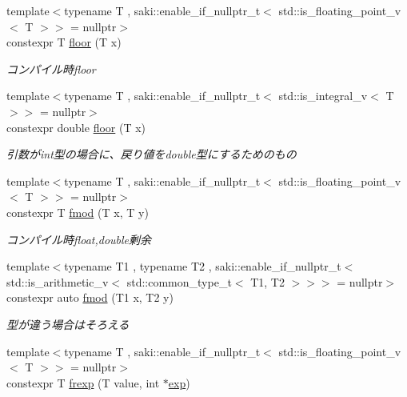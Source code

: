\begin{DoxyCompactItemize}
{\footnotesize template$<$typename T , saki\+::enable\+\_\+if\+\_\+nullptr\+\_\+t$<$ std\+::is\+\_\+floating\+\_\+point\+\_\+v$<$ T $>$$>$  = nullptr$>$ }\\constexpr T \mbox{\hyperlink{namespacesaki_a0718c031975604811084b62bbba93f7f}{floor}} (T x)
\begin{DoxyCompactList}\small\item\em コンパイル時floor \end{DoxyCompactList}\item 
{\footnotesize template$<$typename T , saki\+::enable\+\_\+if\+\_\+nullptr\+\_\+t$<$ std\+::is\+\_\+integral\+\_\+v$<$ T $>$$>$  = nullptr$>$ }\\constexpr double \mbox{\hyperlink{namespacesaki_a327cd6800fef212948644f69cb31d4ff}{floor}} (T x)
\begin{DoxyCompactList}\small\item\em 引数がint型の場合に、戻り値をdouble型にするためのもの \end{DoxyCompactList}\item 
{\footnotesize template$<$typename T , saki\+::enable\+\_\+if\+\_\+nullptr\+\_\+t$<$ std\+::is\+\_\+floating\+\_\+point\+\_\+v$<$ T $>$$>$  = nullptr$>$ }\\constexpr T \mbox{\hyperlink{namespacesaki_a8a7b926b9d370e4a9aed84579675222c}{fmod}} (T x, T y)
\begin{DoxyCompactList}\small\item\em コンパイル時float,double剰余 \end{DoxyCompactList}\item 
{\footnotesize template$<$typename T1 , typename T2 , saki\+::enable\+\_\+if\+\_\+nullptr\+\_\+t$<$ std\+::is\+\_\+arithmetic\+\_\+v$<$ std\+::common\+\_\+type\+\_\+t$<$ T1, T2 $>$$>$$>$  = nullptr$>$ }\\constexpr auto \mbox{\hyperlink{namespacesaki_ae310926c3d50042c53a68ac85b5d6090}{fmod}} (T1 x, T2 y)
\begin{DoxyCompactList}\small\item\em 型が違う場合はそろえる \end{DoxyCompactList}\item 
{\footnotesize template$<$typename T , saki\+::enable\+\_\+if\+\_\+nullptr\+\_\+t$<$ std\+::is\+\_\+floating\+\_\+point\+\_\+v$<$ T $>$$>$  = nullptr$>$ }\\constexpr T \mbox{\hyperlink{namespacesaki_a00438d1cd099cfd0e2938f9e3defd283}{frexp}} (T value, int $\ast$\mbox{\hyperlink{namespacesaki_abc1268e543a60d43b04f1418f5ef3e41}{exp}})

\end{DoxyCompactItemize}
